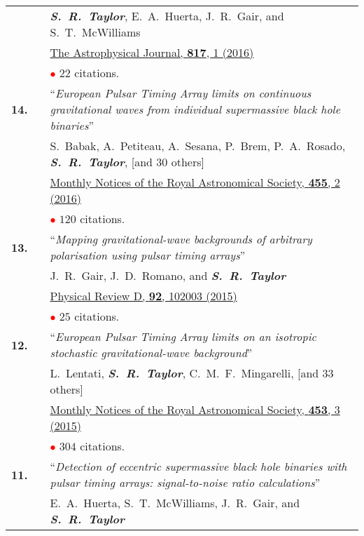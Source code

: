 \documentclass[11pt,letterpaper,sans]{moderncv}
\begin{document}
{\begin{longtable}{rp{0.3cm}p{15.8cm}}
&& \textit{\textbf{S.~R.~Taylor}}, E.~A.~Huerta, J.~R.~Gair, and S.~T.~McWilliams \\ 
&& \href{http://iopscience.iop.org/article/10.3847/0004-637X/817/1/70/meta}{{\color{color1} The Astrophysical Journal, \textbf{817}, 1 (2016)}} \\
&& \textcolor{red}{$\bullet$} $22$ citations. \vspace{0.09cm}\\
\textbf{14.} & & ``\textit{European Pulsar Timing Array limits on continuous gravitational waves from individual supermassive black hole binaries}'' \\ 
&& S.~Babak, A.~Petiteau, A.~Sesana, P.~Brem, P.~A.~Rosado, \textit{\textbf{S.~R.~Taylor}}, [and 30 others] \\ 
&& \href{http://mnras.oxfordjournals.org/content/455/2/1665}{{\color{color1} Monthly Notices of the Royal Astronomical Society, \textbf{455}, 2 (2016)}} \\
&& \textcolor{red}{$\bullet$} $120$ citations. \vspace{0.09cm}\\
\textbf{13.} & & ``\textit{Mapping gravitational-wave backgrounds of arbitrary polarisation using pulsar timing arrays}'' \\ 
&& J.~R.~Gair, J.~D.~Romano, and \textit{\textbf{S.~R.~Taylor}} \\ 
&& \href{http://journals.aps.org/prd/abstract/10.1103/PhysRevD.92.102003}{{\color{color1} Physical Review D, \textbf{92}, 102003 (2015)}} \\
&& \textcolor{red}{$\bullet$} $25$ citations. \vspace{0.09cm}\\
\textbf{12.} & & ``\textit{European Pulsar Timing Array limits on an isotropic stochastic gravitational-wave background}'' \\ 
&& L.~Lentati, \textit{\textbf{S.~R.~Taylor}}, C.~M.~F.~Mingarelli, [and 33 others] \\ 
&& \href{http://mnras.oxfordjournals.org/content/453/3/2576}{{\color{color1} Monthly Notices of the Royal Astronomical Society, \textbf{453}, 3 (2015)}} \\
&& \textcolor{red}{$\bullet$} $304$ citations. \vspace{0.09cm}\\
\textbf{11.} & & ``\textit{Detection of eccentric supermassive black hole binaries with pulsar timing arrays: signal-to-noise ratio calculations}'' \\ && E.~A.~Huerta, S.~T.~McWilliams, J.~R.~Gair, and \textit{\textbf{S.~R.~Taylor}} \\ 

\end{longtable}}
\end{document}

